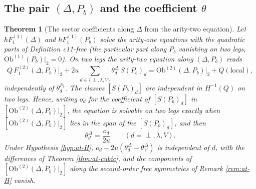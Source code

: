 \documentclass[11pt]{article}
\numberwithin{equation}{section}
\theoremstyle{plain}
\newtheorem{theorem}{Theorem}[section]
\theoremstyle{definition}
\newcommand{\Ob}{\mathrm{Ob}}
\begin{document}
\subsection{The pair $(\Delta,P_b)$ and the coefficient $\theta$}

\begin{theorem}[The sector coefficients along $\Delta$ from the arity-two equation]
\label{thm:at-theta}
Let $\hbar F_1^{(1)}(\Delta)$ and $\hbar F_1^{(1)}(P_b)$ solve the arity-one equations with the quadratic parts of Definition c11-free (the particular part along $P_b$ vanishing on two legs, $\Ob^{(1)}(P_b)|_2=0$). On two legs the arity-two equation along $(\Delta,P_b)$ reads
\begin{equation}
Q\,F_1^{(2)}(\Delta,P_b)\big|_2+2u\sum_{d\in\{\perp,\lambda,V\}}\theta^\Delta_d\,S(P_b)_d=\Ob^{(2)}(\Delta,P_b)\big|_2+Q(\text{local}),
\label{eq:at-theta}
\end{equation}
independently of $\theta^{P_b}_d$. The classes $[S(P_b)_d]$ are independent in $H^{-1}(Q)$ on two legs. Hence, writing $o_d$ for the coefficient of $[S(P_b)_d]$ in $[\Ob^{(2)}(\Delta,P_b)|_2]$, the equation is solvable on two legs exactly when $[\Ob^{(2)}(\Delta,P_b)|_2]$ lies in the span of the $[S(P_b)_d]$, and then
\[
\theta^\Delta_d=\frac{o_d}{2u}\qquad(d=\perp,\lambda,V).
\]
Under Hypothesis \ref{hyp:at-H}, $o_d-2u(\theta^\Delta_d-\theta^\Delta_V)$ is independent of $d$, with the differences of Theorem \ref{thm:at-cubic}, and the components of $[\Ob^{(2)}(\Delta,P_b)|_2]$ along the second-order free symmetries of Remark \ref{rem:at-H} vanish.
\end{theorem}
\end{document}
